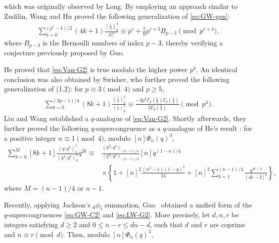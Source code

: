 \documentclass[12pt]{article}
\numberwithin{equation}{section}
\begin{document}
which was originally observed by Long\cite{Long}. By employing an approach similar to Zudilin\cite{Zu}, Wang and Hu\cite{Wang-Hu} proved the following generalization of \eqref{eq:GW-gen}:
\begin{align}\label{eq:WH}
    \sum_{k=0}^{(p^r-1)/2}(4k+1)\frac{(\frac{1}{2})_k^4}{k!^4}\equiv p^r+\frac{7}{6}p^{r+3}B_{p-3}\pmod{p^{r+4}},
\end{align}
where $B_{p-3}$ is the Bernoulli numbers of index $p-3$, thereby verifying a conjecture previously proposed by Guo\cite[Conjecture~6.2]{Guo-fourth}.\par
He\cite{He} proved that \eqref{eq:Van-G2} is true modulo the higher power $p^4$. An identical conclusion was also obtained by Swisher\cite{Swisher}, who further proved the following generalization of (1.2):
for $p\equiv 3\pmod4$ and $p\geqslant5$,
\begin{align}\label{eq:Swisher}
    \sum_{k=0}^{(3p-1)/4}(8k+1)\frac{(\tfrac14)^4_k}{(1)^4_k}\equiv \frac{-3p^2\Gamma_p(\tfrac12)\Gamma_p(\tfrac14)}{2\Gamma_p(\tfrac34)}\pmod{p^4}.
\end{align}
Liu and Wang\cite{LW-G2-p3} established a $q$-analogue of \eqref{eq:Van-G2}. Shortly afterwards, 
they\cite{Liu-Wang-G2} further proved the following $q$-supercongruence as a $q$-analogue of He's result : for a positive integer $n\equiv1 \pmod4$, modulo ${[n]\Phi_n(q)^3}$,
\begin{align}\label{eq:LW-G2}
    \sum_{k=0}^{M}[8k+1]\frac{(q;q^4)^4_k}{(q^4;q^4)^4_k}q^{2k}\equiv &\frac{(q^2;q^4)_{(n-1)/4}}{(q^4;q^4)_{(n-1)/4}}[n]q^{(1-n)/4}\nonumber\\
    &\times\left\{1+[n]^2\frac{(n^2-1)(1-q)^2}{24}
+ [n]^2\sum_{k=1}^{(n-1)/4}\frac{q^{4k-2}}{[4k-2]^2}\right\},
\end{align}
where $M=(n-1)/4$ or $n-1$.

Recently, applying Jackson's ${}_6\phi_5$ summation,
Guo~\cite{Guo-jack} obtained a unified form of the
$q$-supercongruences \eqref{eq:GW-C2} and \eqref{eq:LW-G2}.
More precisely, let $d,n,r$ be integers satisfying
$d \geqslant 2$ and $0 \leqslant n-r \leqslant dn-d$,
such that $d$ and $r$ are coprime and $n \equiv r \pmod{d}$.
Then, modulo $[n]\Phi_n(q)^3$,
\end{document}
